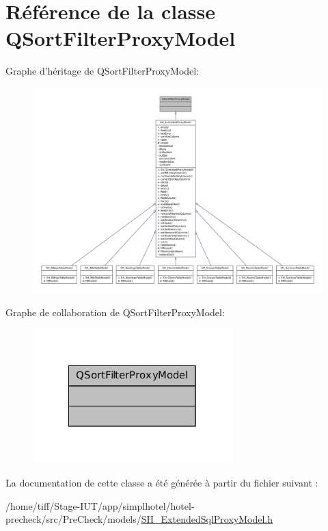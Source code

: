 \hypertarget{classQSortFilterProxyModel}{\section{Référence de la classe Q\-Sort\-Filter\-Proxy\-Model}
\label{classQSortFilterProxyModel}
}


Graphe d'héritage de Q\-Sort\-Filter\-Proxy\-Model\-:\nopagebreak
\begin{figure}[H]
\begin{center}
\leavevmode
\includegraphics[width=350pt]{classQSortFilterProxyModel__inherit__graph}
\end{center}
\end{figure}


Graphe de collaboration de Q\-Sort\-Filter\-Proxy\-Model\-:\nopagebreak
\begin{figure}[H]
\begin{center}
\leavevmode
\includegraphics[width=218pt]{classQSortFilterProxyModel__coll__graph}
\end{center}
\end{figure}


La documentation de cette classe a été générée à partir du fichier suivant \-:\begin{DoxyCompactItemize}
\item 
/home/tiff/\-Stage-\/\-I\-U\-T/app/simplhotel/hotel-\/precheck/src/\-Pre\-Check/models/\hyperlink{SH__ExtendedSqlProxyModel_8h}{S\-H\-\_\-\-Extended\-Sql\-Proxy\-Model.\-h}\end{DoxyCompactItemize}
